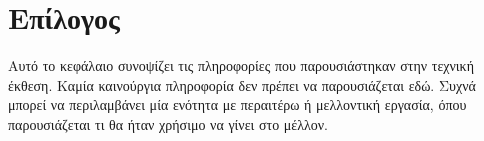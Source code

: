 \documentclass[a4paper,oneside,12pt]{book}
\begin{document}
\chapter{Επίλογος}
Αυτό το κεφάλαιο συνοψίζει τις πληροφορίες που παρουσιάστηκαν στην τεχνική έκθεση. Καμία καινούργια πληροφορία δεν πρέπει να παρουσιάζεται εδώ. Συχνά μπορεί να περιλαμβάνει μία ενότητα με περαιτέρω ή μελλοντική εργασία, όπου παρουσιάζεται τι θα ήταν χρήσιμο να γίνει στο μέλλον.

\printbibliography[title={\textgreek{Βιβλιογραφία}}]
\end{document}
